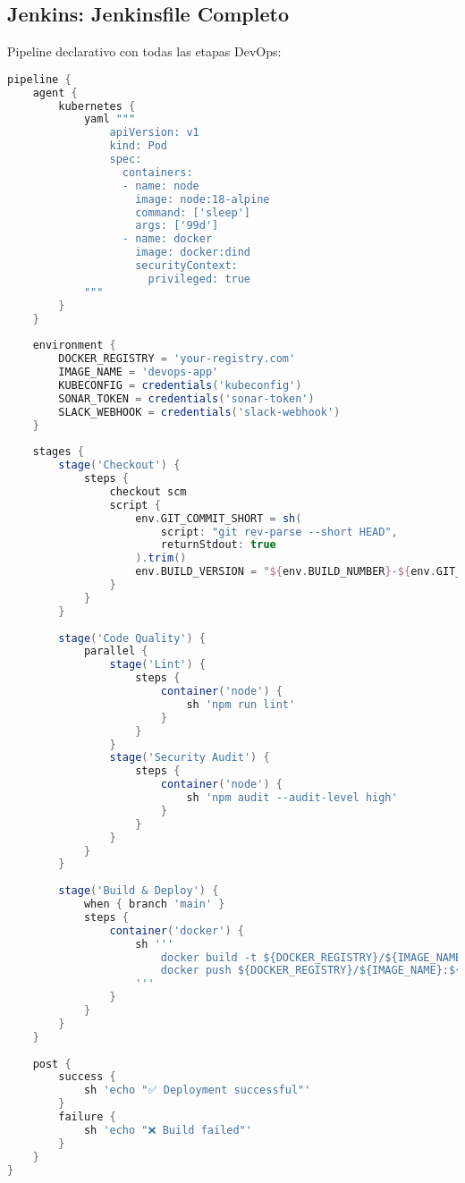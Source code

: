 \documentclass[12pt,a4paper]{article}
\begin{document}
\subsection{Jenkins: Jenkinsfile Completo}
Pipeline declarativo con todas las etapas DevOps:
\begin{lstlisting}[language=groovy, caption=Jenkins - Pipeline completo, basicstyle=\ttfamily\tiny]
pipeline {
    agent {
        kubernetes {
            yaml """
                apiVersion: v1
                kind: Pod
                spec:
                  containers:
                  - name: node
                    image: node:18-alpine
                    command: ['sleep']
                    args: ['99d']
                  - name: docker
                    image: docker:dind
                    securityContext:
                      privileged: true
            """
        }
    }
    
    environment {
        DOCKER_REGISTRY = 'your-registry.com'
        IMAGE_NAME = 'devops-app'
        KUBECONFIG = credentials('kubeconfig')
        SONAR_TOKEN = credentials('sonar-token')
        SLACK_WEBHOOK = credentials('slack-webhook')
    }
    
    stages {
        stage('Checkout') {
            steps {
                checkout scm
                script {
                    env.GIT_COMMIT_SHORT = sh(
                        script: "git rev-parse --short HEAD",
                        returnStdout: true
                    ).trim()
                    env.BUILD_VERSION = "${env.BUILD_NUMBER}-${env.GIT_COMMIT_SHORT}"
                }
            }
        }
        
        stage('Code Quality') {
            parallel {
                stage('Lint') {
                    steps {
                        container('node') {
                            sh 'npm run lint'
                        }
                    }
                }
                stage('Security Audit') {
                    steps {
                        container('node') {
                            sh 'npm audit --audit-level high'
                        }
                    }
                }
            }
        }
        
        stage('Build & Deploy') {
            when { branch 'main' }
            steps {
                container('docker') {
                    sh '''
                        docker build -t ${DOCKER_REGISTRY}/${IMAGE_NAME}:${BUILD_VERSION} .
                        docker push ${DOCKER_REGISTRY}/${IMAGE_NAME}:${BUILD_VERSION}
                    '''
                }
            }
        }
    }
    
    post {
        success {
            sh 'echo "✅ Deployment successful"'
        }
        failure {
            sh 'echo "❌ Build failed"'
        }
    }
}
\end{lstlisting}
\end{document}
